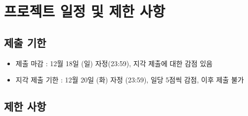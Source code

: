 \section{프로젝트 일정 및 제한 사항}{\label{sec:schedule}}

\subsection{제출 기한}
\begin{itemize}\tightlist
    \item 제출 마감 : 12월 18일 (일) 자정(23:59), 지각 제출에 대한 감점 있음
    \item 지각 제출 기한 : 12월 20일 (화) 자정 (23:59), 일당 5점씩 감점, 이후 제출 불가
\end{itemize}


\subsection{제한 사항}
